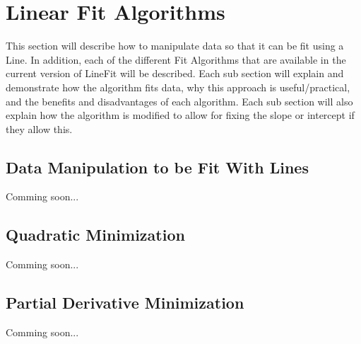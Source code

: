 \documentclass[titlepage,12pt]{article}
\begin{document}
\section{Linear Fit Algorithms}
\label{sec:algorithms}

This section will describe how to manipulate data so that it can be fit using a Line. In addition, each of the different Fit Algorithms that are available in the current version of LineFit will be described. Each sub section will explain and demonstrate how the algorithm fits data, why this approach is useful/practical, and the benefits and disadvantages of each algorithm. Each sub section will also explain how the algorithm is modified to allow for fixing the slope or intercept if they allow this.



\subsection{Data Manipulation to be Fit With Lines}
\label{sec:dataManipulation}

Comming soon...

\subsection{Quadratic Minimization}

Comming soon...

\subsection{Partial Derivative Minimization}

Comming soon...
\end{document}

